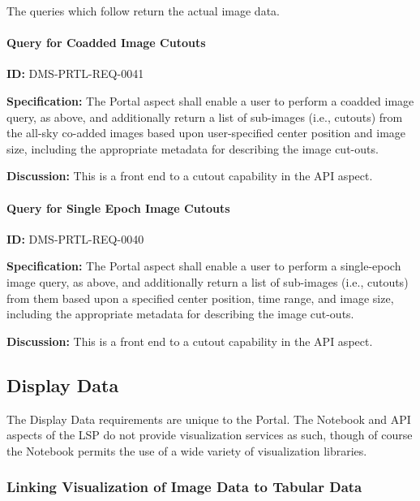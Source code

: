 \documentclass[SE,toc,lsstdraft]{lsstdoc}
\begin{document}
The queries which follow return the actual image data.

\paragraph{Query for Coadded Image Cutouts}\hfill  %

\label{DMS-PRTL-REQ-0041}
\textbf{ID:} DMS-PRTL-REQ-0041

\textbf{Specification:}
The Portal aspect shall enable a user to perform a coadded image query, as above, and additionally return a list of sub-images (i.e., cutouts) from the all-sky co-added images based upon user-specified center position and image size, including the appropriate metadata for describing the image cut-outs.

\textbf{Discussion:}
This is a front end to a cutout capability in the API aspect.

\paragraph{Query for Single Epoch Image Cutouts}\hfill  %

\label{DMS-PRTL-REQ-0040}
\textbf{ID:} DMS-PRTL-REQ-0040

\textbf{Specification:}
The Portal aspect shall enable a user to perform a single-epoch image query, as above, and additionally return a list of sub-images (i.e., cutouts) from them based upon a specified center position, time range, and image size, including the appropriate metadata for describing the image cut-outs.

\textbf{Discussion:}
This is a front end to a cutout capability in the API aspect.

\subsection{Display Data}

The Display Data requirements are unique to the Portal.  The Notebook and API aspects of the LSP do not provide visualization services as such, though of course the Notebook permits the use of a wide variety of visualization libraries.

\subsubsection{Linking Visualization of Image Data to Tabular Data}
\end{document}
